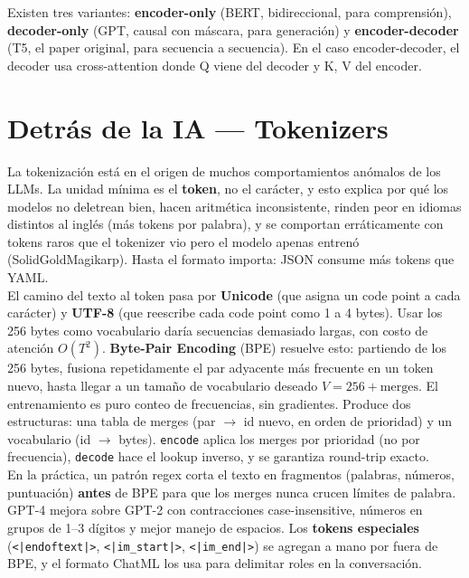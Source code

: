 \documentclass[11pt,a4paper]{article}
\begin{document}
Existen tres variantes: \textbf{encoder-only} (BERT, bidireccional, para comprensi\'on), \textbf{decoder-only} (GPT, causal con m\'ascara, para generaci\'on) y \textbf{encoder-decoder} (T5, el paper original, para secuencia a secuencia). En el caso encoder-decoder, el decoder usa cross-attention donde Q viene del decoder y K, V del encoder. \\[1ex]

\section{Detr\'as de la IA --- Tokenizers}

La tokenizaci\'on est\'a en el origen de muchos comportamientos an\'omalos de los LLMs. La unidad m\'inima es el \textbf{token}, no el car\'acter, y esto explica por qu\'e los modelos no deletrean bien, hacen aritm\'etica inconsistente, rinden peor en idiomas distintos al ingl\'es (m\'as tokens por palabra), y se comportan err\'aticamente con tokens raros que el tokenizer vio pero el modelo apenas entren\'o (SolidGoldMagikarp). Hasta el formato importa: JSON consume m\'as tokens que YAML. \\[1ex]

El camino del texto al token pasa por \textbf{Unicode} (que asigna un code point a cada car\'acter) y \textbf{UTF-8} (que reescribe cada code point como 1 a 4 bytes). Usar los 256 bytes como vocabulario dar\'ia secuencias demasiado largas, con costo de atenci\'on $O(T^2)$. \textbf{Byte-Pair Encoding} (BPE) resuelve esto: partiendo de los 256 bytes, fusiona repetidamente el par adyacente m\'as frecuente en un token nuevo, hasta llegar a un tama\~no de vocabulario deseado $V = 256 + \text{merges}$. El entrenamiento es puro conteo de frecuencias, sin gradientes. Produce dos estructuras: una tabla de merges (par $\to$ id nuevo, en orden de prioridad) y un vocabulario (id $\to$ bytes). \texttt{encode} aplica los merges por prioridad (no por frecuencia), \texttt{decode} hace el lookup inverso, y se garantiza round-trip exacto. \\[1ex]

En la pr\'actica, un patr\'on regex corta el texto en fragmentos (palabras, n\'umeros, puntuaci\'on) \textbf{antes} de BPE para que los merges nunca crucen l\'imites de palabra. GPT-4 mejora sobre GPT-2 con contracciones case-insensitive, n\'umeros en grupos de 1--3 d\'igitos y mejor manejo de espacios. Los \textbf{tokens especiales} (\texttt{<|endoftext|>}, \texttt{<|im\_start|>}, \texttt{<|im\_end|>}) se agregan a mano por fuera de BPE, y el formato ChatML los usa para delimitar roles en la conversaci\'on. \\[1ex]
\end{document}
